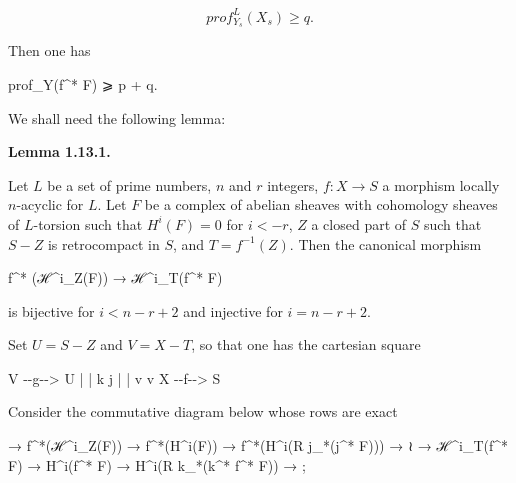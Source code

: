 \documentclass[
]{article}
\newenvironment{Shaded}{}{}
\newcommand{\NormalTok}[1]{#1}
\begin{document}
\[
prof^{L}_{Y_{s}}(X_{s}) \geqslant q.
\]

Then one has

\begin{Shaded}
\begin{Highlighting}[]
\NormalTok{prof\_Y(f\^{}* F) ⩾ p + q.}
\end{Highlighting}
\end{Shaded}

We shall need the following lemma:

\textbf{Lemma 1.13.1.}

Let \(L\) be a set of prime numbers, \(n\) and \(r\) integers,
\(f : X \to S\) a morphism locally \(n\)-acyclic for \(L\). Let \(F\) be
a complex of abelian sheaves with cohomology sheaves of \(L\)-torsion
such that \(H^{i}(F) = 0\) for \(i < -r\), \(Z\) a closed part of \(S\)
such that \(S - Z\) is retrocompact in \(S\), and \(T = f^{-1}(Z)\).
Then the canonical morphism

\begin{Shaded}
\begin{Highlighting}[]
\NormalTok{f\^{}* (ℋ\^{}i\_Z(F)) → ℋ\^{}i\_T(f\^{}* F)}
\end{Highlighting}
\end{Shaded}

is bijective for \(i < n - r + 2\) and injective for \(i = n - r + 2\).

Set \(U = S - Z\) and \(V = X - T\), so that one has the cartesian
square

\begin{Shaded}
\begin{Highlighting}[]
\NormalTok{V {-}{-}g{-}{-}\textgreater{} U}
\NormalTok{|        |}
\NormalTok{k        j}
\NormalTok{|        |}
\NormalTok{v        v}
\NormalTok{X {-}{-}f{-}{-}\textgreater{} S}
\end{Highlighting}
\end{Shaded}

Consider the commutative diagram below whose rows are exact

\begin{Shaded}
\begin{Highlighting}[]
\NormalTok{→ f\^{}*(ℋ\^{}i\_Z(F))    → f\^{}*(H\^{}i(F))    → f\^{}*(H\^{}i(R j\_*(j\^{}* F)))    →}
\NormalTok{                       ≀}
\NormalTok{→ ℋ\^{}i\_T(f\^{}* F)     → H\^{}i(f\^{}* F)     → H\^{}i(R k\_*(k\^{}* f\^{}* F))     → ;}
\end{Highlighting}
\end{Shaded}
\end{document}
